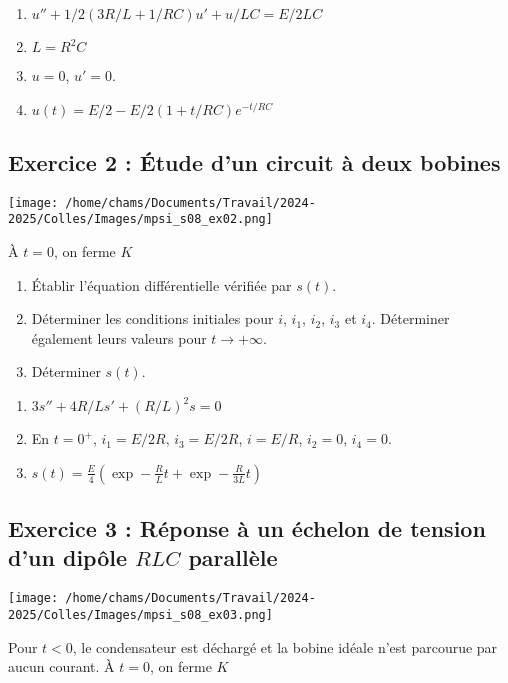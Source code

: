 \begin{enumerate}
	\item $u'' + 1/2(3R/L + 1/RC)u' + u/LC = E/2LC$
	\item $L = R^2 C$
	\item $u=0$, $u'=0$.
	\item $u(t) = E/2 - E/2(1+t/RC)e^{-t/RC}$
\end{enumerate}

\subsection{Exercice 2 : Étude d'un circuit à deux bobines}

\begin{minipage}[c]{\linewidth/2}
	\texttt{[image: /home/chams/Documents/Travail/2024-2025/Colles/Images/mpsi\_s08\_ex02.png]}
\end{minipage}%
\begin{minipage}[c]{\linewidth/2}
	À $t=0$, on ferme $K$
\end{minipage}

\begin{enumerate}
	\item Établir l'équation différentielle vérifiée par $s(t)$.
	\item Déterminer les conditions initiales pour $i$, $i_1$, $i_2$, $i_3$ et $i_4$. Déterminer également leurs valeurs pour $t\rightarrow+\infty$.
	\item Déterminer $s(t)$. 
\end{enumerate}

\begin{enumerate}
	\item $3s'' + 4R/L s' + (R/L)^2 s = 0$
	\item En $t=0^+$, $i_1=E/2R$, $i_3=E/2R$, $i=E/R$, $i_2=0$, $i_4=0$.
	\item $s(t) = \frac{E}{4} \left( \exp -\frac{R}{L}t +  \exp -\frac{R}{3L}t \right)$
\end{enumerate}


\subsection{Exercice 3 : Réponse à un échelon de tension d'un dipôle $RLC$ parallèle}

\begin{minipage}[c]{\linewidth/2}
	\texttt{[image: /home/chams/Documents/Travail/2024-2025/Colles/Images/mpsi\_s08\_ex03.png]}
\end{minipage}%
\begin{minipage}[c]{\linewidth/2}
	Pour $t<0$, le condensateur est déchargé et la bobine idéale n'est parcourue par aucun courant. À $t=0$, on ferme $K$
\end{minipage}

